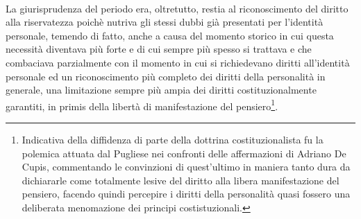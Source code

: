 \\La giurisprudenza del periodo era, oltretutto, restia al riconoscimento del diritto alla riservatezza poichè nutriva gli stessi dubbi già presentati per l'identità personale, temendo di fatto, anche a causa del momento storico in cui questa necessità diventava più forte e di cui sempre più spesso si trattava e che combaciava parzialmente con il momento in cui si richiedevano diritti all'identità personale ed un riconoscimento più completo dei diritti della personalità in generale, una limitazione sempre più ampia dei diritti costituzionalmente garantiti, in primis della libertà di manifestazione del pensiero\footnote{Indicativa della diffidenza di parte della dottrina costituzionalista fu la polemica attuata dal Pugliese nei confronti delle affermazioni di Adriano De Cupis, commentando le convinzioni di quest'ultimo in maniera tanto dura da dichiararle come totalmente lesive del diritto alla libera manifestazione del pensiero, facendo quindi percepire i diritti della personalità quasi fossero una deliberata menomazione dei principi costistuzionali.}.

